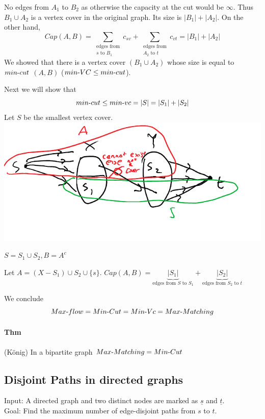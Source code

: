 \documentclass[12 pt]{article}
\begin{document}
        No edges from $A_1$ to $B_2$ as otherwise the capacity at the
        cut would be $\infty$. Thus $B_1 \cup A_2$ is a vertex cover
        in the original graph. Its size is $|B_1|+|A_2|$. On the other
        hand,
        $$Cap(A,B) = \sum_{\substack{\text{edges from} \\ s\text{ to }B_1}} c_{sv}
        + \sum_{\substack{\text{edges from} \\ A_2\text{ to }t}} c_{vt}= |B_1| + |A_2|$$
        We showed that there is a vertex cover $(B_1 \cup A_2)$ whose
        size is equal to $min\hbox{-}cut$ $(A,B)$ ($min\hbox{-}VC \leq
        min\hbox{-}cut$).

        Next we will show that
        $$min\hbox{-}cut \leq min\hbox{-}vc = |S| = |S_1| + |S_2|$$
        Let $S$ be the smallest vertex cover.
        \\ \includegraphics[width=.9\textwidth]{i65.pdf}

        $S = S_1 \cup S_2, B=A^c$
        
        Let $A=(X-S_1)\cup S_2 \cup \{s\}$. $Cap(A,B)=
        \underbrace{|S_1|}_{\text{edges from $S$ to $S_1$}} +
        \underbrace{|S_2|}_{\text{edges from $S_2$ to $t$}}$

        We conclude $$Max\hbox{-} flow = Min\hbox{-}Cut = Min\hbox{-}Vc = Max\hbox{-}Matching$$

        \paragraph{Thm} (K\"onig) In a bipartite graph $Max\hbox{-}Matching =
        Min\hbox{-}Cut$
        \subsection{Disjoint Paths in directed graphs}
        Input: A directed graph and two distinct nodes are marked as
        $\underline{s}$ and $\underline{t}$.
        \\ Goal: Find the maximum number of edge-disjoint paths from
        $s$ to $t$.
\end{document}
